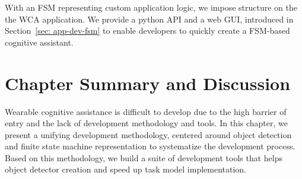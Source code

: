 With an FSM representing custom application logic, we impose structure on the
the WCA application. We provide a python API and a web GUI, introduced in
Section~\ref{sec: app-dev-fsm} to enable developers to quickly create a
FSM-based cognitive assistant. 




\section{Chapter Summary and Discussion}

Wearable cognitive assistance is difficult to develop due to the high barrier of
entry and the lack of development methodology and tools. In this chapter, we
present a unifying development methodology, centered around object detection and
finite state machine representation to systematize the development process.
Based on this methodology, we build a suite of development tools that helps
object detector creation and speed up task model implementation. 

